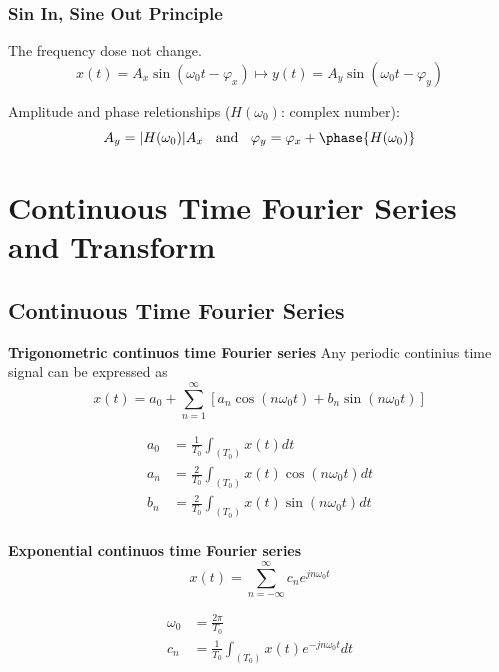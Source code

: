 \documentclass{article}
\begin{document}
\subsubsection{Sin In, Sine Out Principle}
The frequency dose not change.
\begin{equation}
    x(t)=A_x\sin(\omega_0t-\varphi_x) \mapsto y(t)=A_y\sin(\omega_0t-\varphi_y)
\end{equation}

Amplitude and phase reletionships ($H(\omega_0)$: complex number):
\begin{equation}
    A_y=|H(\omega_0)|A_x \;\; \text{ and } \;\; \varphi_y=\varphi_x+\phase{H(\omega_0)}
\end{equation}


\newpage

\section{Continuous Time Fourier Series and Transform}
\subsection{Continuous Time Fourier Series}
\textbf{Trigonometric continuos time Fourier series}
Any periodic continius time signal can be expressed as
\begin{equation*}
    x(t) = a_0 + \sum_{n=1}^{\infty} [a_n\cos(n\omega_0t) + b_n\sin(n\omega_0t)]
\end{equation*}

\begin{align*}
    a_0 &= \frac{1}{T_0}\int_{(T_0)} x(t) dt \\
    a_n &= \frac{2}{T_0}\int_{(T_0)} x(t)\cos(n\omega_0t) dt \\
    b_n &= \frac{2}{T_0}\int_{(T_0)} x(t)\sin(n\omega_0t) dt \\
\end{align*}

\textbf{Exponential continuos time Fourier series}
\begin{equation*}
    x(t) = \sum_{n=-\infty}^{\infty} c_n e^{jn\omega_0t}
\end{equation*}

\begin{align*}
    \omega_0 &= \frac{2\pi}{T_0} \\
    c_n &= \frac{1}{T_0}\int_{(T_0)} x(t)e^{-jn\omega_0t} dt
\end{align*}
\end{document}
